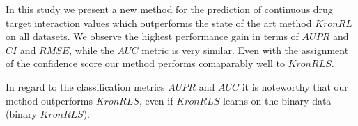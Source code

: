 In this study we present a new method for the prediction of continuous drug target interaction values which outperforms the state of the art method $KronRL$ on all datasets. We observe the highest performance gain in terms of $AUPR$ and $CI$ and $RMSE$, while the $AUC$ metric is very similar. Even with the assignment of the confidence score our method performs comaparably well to $KronRLS$.

In regard to the classification metrics $AUPR$ and $AUC$ it is noteworthy that our method outperforms $KronRLS$, even if $KronRLS$ learns on the binary data (binary $KronRLS$). 




